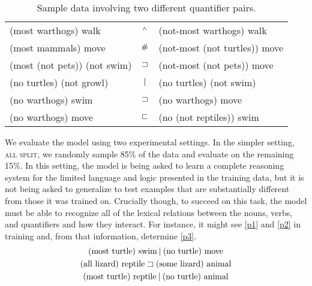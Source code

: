 

\begin{table}[htp]
  \centering
  \begin{tabular}{l c l}
    \toprule
    (most warthogs) walk         & $\mathbin{^{\wedge}}$ & (not-most warthogs) walk\\
    (most mammals) move          & $\mathbin{\#}$ &  (not-most (not turtles)) move\\
    (most (not pets)) (not swim) & $\sqsupset$ & (not-most (not pets)) move 
    \\[2ex]    
    (no turtles) (not growl)     & $\mathbin{|}$ & (no turtles) (not swim)\\
    (no warthogs) swim           & $\sqsupset$ & (no warthogs) move\\
    (no warthogs) move           & $\sqsubset$ & (no (not reptiles)) swim\\
    \bottomrule
  \end{tabular}
  \caption{Sample data involving two different quantifier pairs.}
  \label{examplesofdata}
\end{table}

We evaluate the model using two experimental settings. In the simpler
setting, \textsc{all split}, we randomly sample 85\% of the data and evaluate on the
remaining 15\%. In this setting, the model is being asked to learn a
complete reasoning system for the limited language and logic presented
in the training data, but it is not being asked to generalize to test
examples that are substantially different from those it was trained
on. Crucially though, to succeed on this task, the model must be able
to recognize all of the lexical relations between the nouns, verbs,
and quantifiers and how they interact. For instance, it might see
\eqref{p1} and \eqref{p2} in training and, from that information,
determine \eqref{p3}.
%
\begin{gather}
  \text{(most turtle) swim} \mathbin{|} \text{(no turtle) move}\label{p1}
  \\
  \text{(all lizard) reptile} \sqsupset  \text{(some lizard) animal}\label{p2}
  \\
  \text{(most turtle) reptile} \mathbin{|} \text{(no turtle) animal}\label{p3}
\end{gather}

